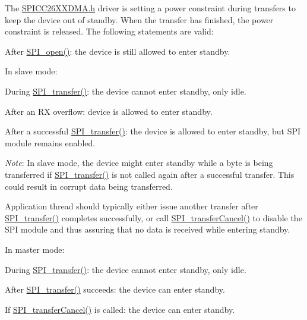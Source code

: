 The \hyperlink{_s_p_i_c_c26_x_x_d_m_a_8h}{S\-P\-I\-C\-C26\-X\-X\-D\-M\-A.\-h} driver is setting a power constraint during transfers to keep the device out of standby. When the transfer has finished, the power constraint is released. The following statements are valid\-:
\begin{DoxyItemize}
\item After \hyperlink{_s_p_i_8h_a62cfe494cb1df47cd602e8747e894fd1}{S\-P\-I\-\_\-open()}\-: the device is still allowed to enter standby.
\item In slave mode\-:
\begin{DoxyItemize}
\item During \hyperlink{_s_p_i_8h_a989e17f96b54fcc3dc2cac5f8ac6bdb2}{S\-P\-I\-\_\-transfer()}\-: the device cannot enter standby, only idle.
\item After an R\-X overflow\-: device is allowed to enter standby.
\item After a successful \hyperlink{_s_p_i_8h_a989e17f96b54fcc3dc2cac5f8ac6bdb2}{S\-P\-I\-\_\-transfer()}\-: the device is allowed to enter standby, but S\-P\-I module remains enabled.
\begin{DoxyItemize}
\item {\itshape Note}\-: In slave mode, the device might enter standby while a byte is being transferred if \hyperlink{_s_p_i_8h_a989e17f96b54fcc3dc2cac5f8ac6bdb2}{S\-P\-I\-\_\-transfer()} is not called again after a successful transfer. This could result in corrupt data being transferred.
\end{DoxyItemize}
\item Application thread should typically either issue another transfer after \hyperlink{_s_p_i_8h_a989e17f96b54fcc3dc2cac5f8ac6bdb2}{S\-P\-I\-\_\-transfer()} completes successfully, or call \hyperlink{_s_p_i_8h_a6819f7761fc3505c4f885653ff8121f0}{S\-P\-I\-\_\-transfer\-Cancel()} to disable the S\-P\-I module and thus assuring that no data is received while entering standby.
\end{DoxyItemize}
\item In master mode\-:
\begin{DoxyItemize}
\item During \hyperlink{_s_p_i_8h_a989e17f96b54fcc3dc2cac5f8ac6bdb2}{S\-P\-I\-\_\-transfer()}\-: the device cannot enter standby, only idle.
\item After \hyperlink{_s_p_i_8h_a989e17f96b54fcc3dc2cac5f8ac6bdb2}{S\-P\-I\-\_\-transfer()} succeeds\-: the device can enter standby.
\item If \hyperlink{_s_p_i_8h_a6819f7761fc3505c4f885653ff8121f0}{S\-P\-I\-\_\-transfer\-Cancel()} is called\-: the device can enter standby.
\end{DoxyItemize}
\end{DoxyItemize}

